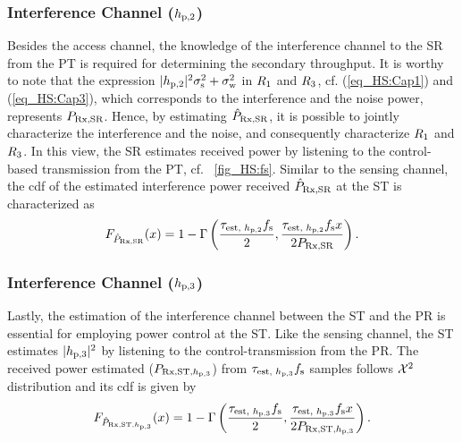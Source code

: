 \subsubsection*{Interference Channel ($h_{\text{p,2}}$)}
Besides the access channel, the knowledge of the interference channel to the SR from the PT is required for determining the secondary throughput. It is worthy to note that the expression $|h_{\text{p,2}}|^2 \sigma^2_{\text{s}} + \sigma^2_{\text{w}}$ in $R_{\text{1}}$ and $R_{\text{3}}$, cf. (\ref{eq_HS:Cap1}) and (\ref{eq_HS:Cap3}), which corresponds to the interference and the noise power, represents $P_{\text{Rx,SR}}$. Hence, by estimating $\hat{P}_{\text{Rx,SR}}$, it is possible to jointly characterize the interference and the noise, and consequently characterize $R_{\text{1}}$ and $R_{\text{3}}$.  
In this view, the SR estimates received power by listening to the control-based transmission from the PT, cf. \figurename~\ref{fig_HS:fs}. Similar to the sensing channel, the cdf of the estimated interference power received $\hat{P}_{\text{Rx,SR}}$ at the ST is characterized as
\begin{align}
F_{\hat{P}_{\text{Rx,SR}}}(x) = 1 - \Gamma \left( \frac{\tau_{\text{est, $h_{\text{p,2}}$}} f_{\text{s}}}{2}, \frac{\tau_{\text{est, $h_{\text{p,2}}$}} f_{\text{s}} x}{2 P_{\text{Rx,SR}}} \right) \label{eq_HS:fprcvdsr}.
\end{align}

  

\subsubsection*{Interference Channel ($h_{\text{p,3}}$)}
Lastly, the estimation of the interference channel between the ST and the PR is essential for employing power control at the ST. Like the sensing channel, the ST estimates $|h_{\text{p,3}}|^2$ by listening to the control-transmission from the PR. The received power estimated ($P_{\text{Rx,ST,$h_{\text{p,3}}$}}$) from $\tau_{\text{est, $h_{\text{p,3}}$}} f_{\text{s}}$ samples follows $\cchi2$ distribution and its cdf is given by  
\begin{align}
F_{\hat{P}_{\text{Rx,ST,$h_{\text{p,3}}$}}}(x) = 1 - \Gamma \left( \frac{\tau_{\text{est, $h_{\text{p,3}}$}} f_{\text{s}}}{2}, \frac{\tau_{\text{est, $h_{\text{p,3}}$}} f_{\text{s}} x}{2 P_{\text{Rx,ST,$h_{\text{p,3}}$}}} \right) \label{eq_HS:fprcvdstpr}.
\end{align}

